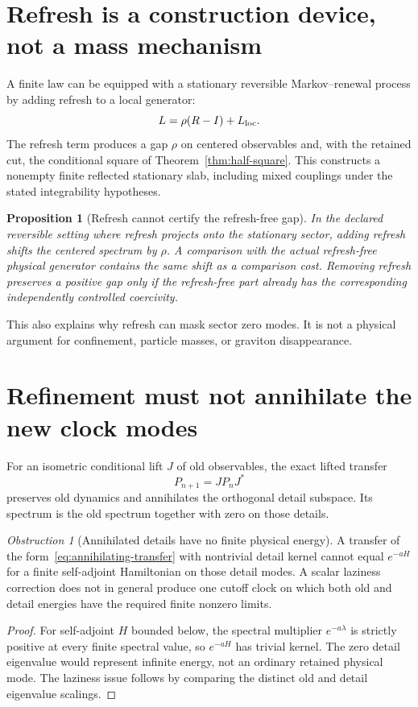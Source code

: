 \documentclass[11pt,a4paper,oneside]{book}
\theoremstyle{plain}
\newtheorem{proposition}[theorem]{Proposition}
\theoremstyle{definition}
\theoremstyle{remark}
\newtheorem{obstruction}[theorem]{Obstruction}
\newcommand{\src}[2]{\cite{#1}}
\begin{document}
\section{Refresh is a construction device, not a mass mechanism}
A finite law can be equipped with a stationary reversible Markov--renewal process by adding refresh to a local generator:
\begin{equation}
 L=\rho(R-I)+L_{\rm loc}.
\end{equation}
The refresh term produces a gap $\rho$ on centered observables and, with the retained cut, the conditional square of Theorem~\ref{thm:half-square}. This constructs a nonempty finite reflected stationary slab, including mixed couplings under the stated integrability hypotheses. \src{GT}{thm:RPESM-reflected-slab}

\begin{proposition}[Refresh cannot certify the refresh-free gap]
\label{prop:refresh}
In the declared reversible setting where refresh projects onto the stationary sector, adding refresh shifts the centered spectrum by $\rho$. A comparison with the actual refresh-free physical generator contains the same shift as a comparison cost. Removing refresh preserves a positive gap only if the refresh-free part already has the corresponding independently controlled coercivity.
\end{proposition}
\src{R14}{thm:v14v94-shift,cor:v14v94-remove,thm:v14v94-correspondence}
This also explains why refresh can mask sector zero modes. It is not a physical argument for confinement, particle masses, or graviton disappearance.

\section{Refinement must not annihilate the new clock modes}
For an isometric conditional lift $J$ of old observables, the exact lifted transfer
\begin{equation}
 P_{n+1}=JP_nJ^*
 \label{eq:annihilating-transfer}
\end{equation}
preserves old dynamics and annihilates the orthogonal detail subspace. Its spectrum is the old spectrum together with zero on those details.

\begin{obstruction}[Annihilated details have no finite physical energy]
\label{obs:annihilation}
A transfer of the form~\eqref{eq:annihilating-transfer} with nontrivial detail kernel cannot equal $e^{-aH}$ for a finite self-adjoint Hamiltonian on those detail modes. A scalar laziness correction does not in general produce one cutoff clock on which both old and detail energies have the required finite nonzero limits.
\end{obstruction}
\begin{proof}
For self-adjoint $H$ bounded below, the spectral multiplier $e^{-a\lambda}$ is strictly positive at every finite spectral value, so $e^{-aH}$ has trivial kernel. The zero detail eigenvalue would represent infinite energy, not an ordinary retained physical mode. The laziness issue follows by comparing the distinct old and detail eigenvalue scalings.
\end{proof}
\cite{R15}
\end{document}
